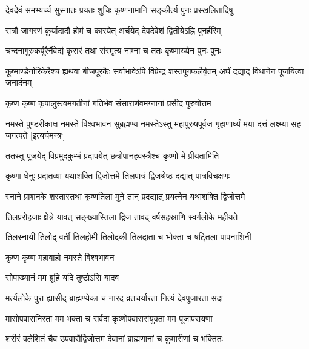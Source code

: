 \twolineshloka
{देवदेवं समभ्यर्च्य सुस्नातः प्रयतः शुचिः}
{कृष्णनामानि सङ्कीर्त्य पुनः प्रस्खलितादिषु}%

\twolineshloka
{रात्रौ जागरणं कुर्यादादौ होमं च कारयेत्}
{अर्चयेद् देवदेवेशं द्वितीयेऽह्नि पुनर्हरिम्}%

\twolineshloka
{चन्दनागुरुकर्पूरैर्नैवेद्यं कृसरं तथा}
{संस्मृत्य नाम्ना च ततः कृष्णाख्येन पुनः पुनः}%

\threelineshloka
{कूष्माण्डैर्नारिकेरैश्च ह्यथवा बीजपूरकैः}
{सर्वाभावेऽपि विप्रेन्द्र शस्तपूगफलैर्वृतम्}
{अर्घं दद्याद् विधानेन पूजयित्वा जनार्दनम्}%

\twolineshloka
{कृष्ण कृष्ण कृपालुस्त्वमगतीनां गतिर्भव}
{संसारार्णवमग्नानां प्रसीद पुरुषोत्तम}%

\threelineshloka
{नमस्ते पुण्डरीकाक्ष नमस्ते विश्वभावन}
{सुब्रह्मण्य नमस्तेऽस्तु महापुरुषपूर्वज}
{गृहाणार्घ्यं मया दत्तं लक्ष्म्या सह जगत्पते}%
[इत्यर्घमन्त्रः]

\twolineshloka
{ततस्तु पूजयेद् विप्रमुदकुम्भं प्रदापयेत्}
{छत्रोपानहवस्त्रैश्च कृष्णो मे प्रीयतामिति}%

\twolineshloka
{कृष्णा धेनुः प्रदातव्या यथाशक्ति द्विजोत्तमे}
{तिलपात्रं द्विजश्रेष्ठ दद्यात् पात्रविचक्षणः}%

\twolineshloka
{स्नाने प्राशनके शस्तास्तथा कृष्णतिला मुने}
{तान् प्रदद्यात् प्रयत्नेन यथाशक्ति द्विजोत्तमे}

\twolineshloka
{तिलप्ररोहजाः क्षेत्रे यावत् सङ्ख्यास्तिला द्विज}%
{तावद् वर्षसहस्राणि स्वर्गलोके महीयते}

\twolineshloka
{तिलस्नायी तिलोद् वर्ती तिलहोमी तिलोदकी}%
{तिलदाता च भोक्ता च षट्तिला पापनाशिनी}


\onelineshloka
{कृष्ण कृष्ण महाबाहो नमस्ते विश्वभावन}%

{सोपाख्यानं मम ब्रूहि यदि तुष्टोऽसि यादव}



\twolineshloka
{मर्त्यलोके पुरा ह्यासीद् ब्राह्मण्येका च नारद}
{व्रतचर्यारता नित्यं देवपूजारता सदा}%

\twolineshloka
{मासोपवासनिरता मम भक्ता च सर्वदा}
{कृष्णोपवाससंयुक्ता मम पूजापरायणा}%

\twolineshloka
{शरीरं क्लेशितं चैव उपवासैर्द्विजोत्तम}
{देवानां ब्राह्मणानां च कुमारीणां च भक्तितः}%

